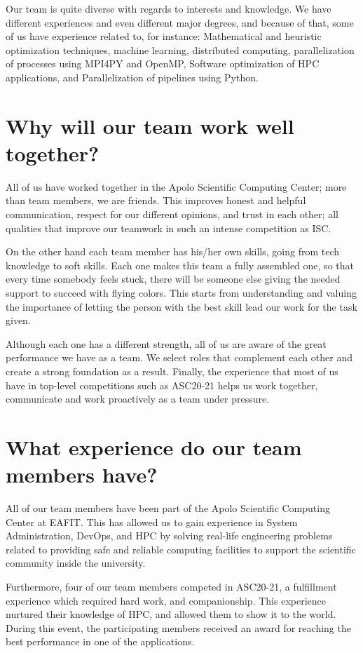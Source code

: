 \documentclass[11pt,a4paper,twocolumn]{article}
\begin{document}
Our team is quite diverse with regards to interests and knowledge. We have different experiences and even different major degrees, and because of that, some of us have experience related to, for instance: Mathematical and heuristic optimization techniques, machine learning, distributed computing, parallelization of processes using MPI4PY and OpenMP, Software optimization of HPC applications, and Parallelization of pipelines using Python.

\section{Why will our team work well together?}

All of us have worked together in the Apolo Scientific Computing Center; more than team members, we are friends. This improves honest and helpful communication, respect for our different opinions, and trust in each other; all qualities that improve our teamwork in such an intense competition as ISC. 

On the other hand each team member has his/her own skills, going from tech knowledge to soft skills. Each one makes this team a fully assembled one, so that every time somebody feels stuck, there will be someone else giving the needed support to succeed with flying colors. This starts from understanding and valuing the importance of letting the person with the best skill lead our work for the task given.

Although each one has a different strength, all of us are aware of the great performance we have as a team. We select roles that complement each other and create a strong foundation as a result. Finally, the experience that most of us have in top-level competitions such as ASC20-21 helps us work together, communicate and work proactively as a team under pressure.

\section{What experience do our team members have?}

All of our team members have been part of the Apolo Scientific Computing Center at EAFIT. This has allowed us to gain experience in System Administration, DevOps, and HPC by solving real-life engineering problems related to providing safe and reliable computing facilities to support the scientific community inside the university. 

Furthermore, four of our team members competed in ASC20-21, a fulfillment experience which required hard work, and companionship. This experience nurtured their knowledge of HPC, and allowed them to show it to the world. During this event, the participating members received an award for reaching the best performance in one of the applications.
\end{document}

